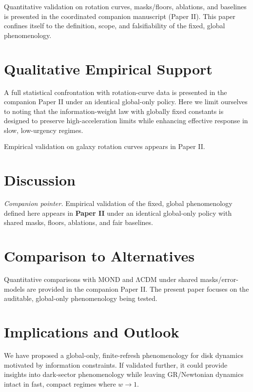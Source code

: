 \documentclass[usenatbib]{mnras}
\begin{document}
Quantitative validation on rotation curves, masks/floors, ablations, and baselines is presented in the coordinated companion manuscript (Paper II). This paper confines itself to the definition, scope, and falsifiability of the fixed, global phenomenology.

\section{Qualitative Empirical Support}
\label{sec:qualitative}

A full statistical confrontation with rotation-curve data is presented in the companion Paper II under an identical global-only policy. Here we limit ourselves to noting that the information-weight law with globally fixed constants is designed to preserve high-acceleration limits while enhancing effective response in slow, low-urgency regimes.

Empirical validation on galaxy rotation curves appears in Paper II.

\section{Discussion}

\noindent\textit{Companion pointer.} Empirical validation of the fixed, global phenomenology defined here appears in \textbf{Paper II} under an identical global-only policy with shared masks, floors, ablations, and fair baselines.

\section{Comparison to Alternatives}

Quantitative comparisons with MOND and ΛCDM under shared masks/error-models are provided in the companion Paper II. The present paper focuses on the auditable, global-only phenomenology being tested.

\section{Implications and Outlook}
\label{sec:conclusion}

We have proposed a global-only, finite-refresh phenomenology for disk dynamics motivated by information constraints. If validated further, it could provide insights into dark-sector phenomenology while leaving GR/Newtonian dynamics intact in fast, compact regimes where $w\to 1$.
\end{document}
